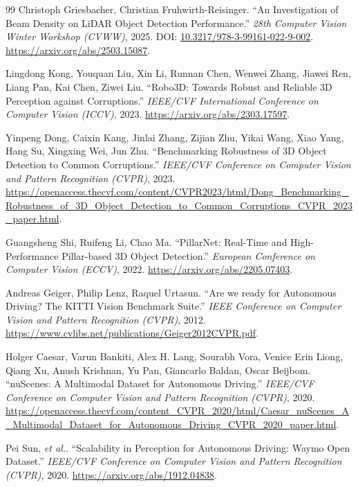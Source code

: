 \documentclass[10pt,twocolumn]{article}
\begin{document}
\begin{thebibliography}{99}
 Christoph Griesbacher, Christian Fruhwirth-Reisinger. ``An Investigation of Beam Density on LiDAR Object Detection Performance.'' \textit{28th Computer Vision Winter Workshop (CVWW)}, 2025. DOI: \href{https://doi.org/10.3217/978-3-99161-022-9-002}{10.3217/978-3-99161-022-9-002}. \url{https://arxiv.org/abs/2503.15087}.

 Lingdong Kong, Youquan Liu, Xin Li, Runnan Chen, Wenwei Zhang, Jiawei Ren, Liang Pan, Kai Chen, Ziwei Liu. ``Robo3D: Towards Robust and Reliable 3D Perception against Corruptions.'' \textit{IEEE/CVF International Conference on Computer Vision (ICCV)}, 2023. \url{https://arxiv.org/abs/2303.17597}.

 Yinpeng Dong, Caixin Kang, Jinlai Zhang, Zijian Zhu, Yikai Wang, Xiao Yang, Hang Su, Xingxing Wei, Jun Zhu. ``Benchmarking Robustness of 3D Object Detection to Common Corruptions.'' \textit{IEEE/CVF Conference on Computer Vision and Pattern Recognition (CVPR)}, 2023. \url{https://openaccess.thecvf.com/content/CVPR2023/html/Dong_Benchmarking_Robustness_of_3D_Object_Detection_to_Common_Corruptions_CVPR_2023_paper.html}.

 Guangsheng Shi, Ruifeng Li, Chao Ma. ``PillarNet: Real-Time and High-Performance Pillar-based 3D Object Detection.'' \textit{European Conference on Computer Vision (ECCV)}, 2022. \url{https://arxiv.org/abs/2205.07403}.

 Andreas Geiger, Philip Lenz, Raquel Urtasun. ``Are we ready for Autonomous Driving? The KITTI Vision Benchmark Suite.'' \textit{IEEE Conference on Computer Vision and Pattern Recognition (CVPR)}, 2012. \url{https://www.cvlibs.net/publications/Geiger2012CVPR.pdf}.

 Holger Caesar, Varun Bankiti, Alex H. Lang, Sourabh Vora, Venice Erin Liong, Qiang Xu, Anush Krishnan, Yu Pan, Giancarlo Baldan, Oscar Beijbom. ``nuScenes: A Multimodal Dataset for Autonomous Driving.'' \textit{IEEE/CVF Conference on Computer Vision and Pattern Recognition (CVPR)}, 2020. \url{https://openaccess.thecvf.com/content_CVPR_2020/html/Caesar_nuScenes_A_Multimodal_Dataset_for_Autonomous_Driving_CVPR_2020_paper.html}.

 Pei Sun, \textit{et al.}. ``Scalability in Perception for Autonomous Driving: Waymo Open Dataset.'' \textit{IEEE/CVF Conference on Computer Vision and Pattern Recognition (CVPR)}, 2020. \url{https://arxiv.org/abs/1912.04838}.


\end{thebibliography}
\end{document}
